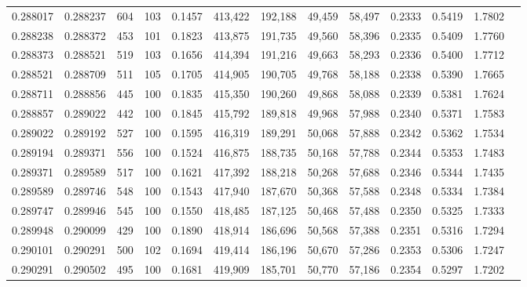 \begin{tabular}{rrrrrrrrrrrrr}
0.288017 & 0.288237 &   604 & 103 &                                     0.1457 & 413,422 & 192,188 &  49,459 &  58,497 & 0.2333 & 0.5419 & 1.7802 \\
0.288238 & 0.288372 &   453 & 101 &                                     0.1823 & 413,875 & 191,735 &  49,560 &  58,396 & 0.2335 & 0.5409 & 1.7760 \\
0.288373 & 0.288521 &   519 & 103 &                                     0.1656 & 414,394 & 191,216 &  49,663 &  58,293 & 0.2336 & 0.5400 & 1.7712 \\
0.288521 & 0.288709 &   511 & 105 &                                     0.1705 & 414,905 & 190,705 &  49,768 &  58,188 & 0.2338 & 0.5390 & 1.7665 \\
0.288711 & 0.288856 &   445 & 100 &                                     0.1835 & 415,350 & 190,260 &  49,868 &  58,088 & 0.2339 & 0.5381 & 1.7624 \\
0.288857 & 0.289022 &   442 & 100 &                                     0.1845 & 415,792 & 189,818 &  49,968 &  57,988 & 0.2340 & 0.5371 & 1.7583 \\
0.289022 & 0.289192 &   527 & 100 &                                     0.1595 & 416,319 & 189,291 &  50,068 &  57,888 & 0.2342 & 0.5362 & 1.7534 \\
0.289194 & 0.289371 &   556 & 100 &                                     0.1524 & 416,875 & 188,735 &  50,168 &  57,788 & 0.2344 & 0.5353 & 1.7483 \\
0.289371 & 0.289589 &   517 & 100 &                                     0.1621 & 417,392 & 188,218 &  50,268 &  57,688 & 0.2346 & 0.5344 & 1.7435 \\
0.289589 & 0.289746 &   548 & 100 &                                     0.1543 & 417,940 & 187,670 &  50,368 &  57,588 & 0.2348 & 0.5334 & 1.7384 \\
0.289747 & 0.289946 &   545 & 100 &                                     0.1550 & 418,485 & 187,125 &  50,468 &  57,488 & 0.2350 & 0.5325 & 1.7333 \\
0.289948 & 0.290099 &   429 & 100 &                                     0.1890 & 418,914 & 186,696 &  50,568 &  57,388 & 0.2351 & 0.5316 & 1.7294 \\
0.290101 & 0.290291 &   500 & 102 &                                     0.1694 & 419,414 & 186,196 &  50,670 &  57,286 & 0.2353 & 0.5306 & 1.7247 \\
0.290291 & 0.290502 &   495 & 100 &                                     0.1681 & 419,909 & 185,701 &  50,770 &  57,186 & 0.2354 & 0.5297 & 1.7202 \\

\end{tabular}

